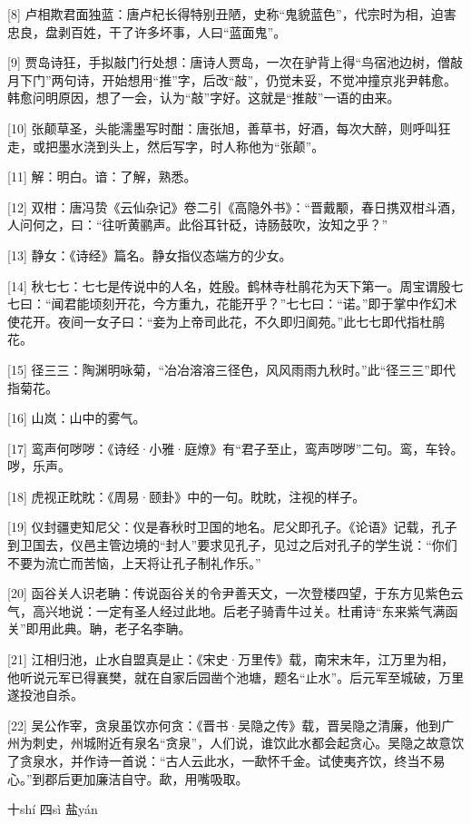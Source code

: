 \documentclass[12pt,UTF8]{ctexbook}
\begin{document}
[8] 卢相欺君面独蓝：唐卢杞长得特别丑陋，史称“鬼貌蓝色”，代宗时为相，迫害忠良，盘剥百姓，干了许多坏事，人曰“蓝面鬼”。

[9] 贾岛诗狂，手拟敲门行处想：唐诗人贾岛，一次在驴背上得“鸟宿池边树，僧敲月下门”两句诗，开始想用“推”字，后改“敲”，仍觉未妥，不觉冲撞京兆尹韩愈。韩愈问明原因，想了一会，认为“敲”字好。这就是“推敲”一语的由来。

[10] 张颠草圣，头能濡墨写时酣：唐张旭，善草书，好酒，每次大醉，则呼叫狂走，或把墨水浇到头上，然后写字，时人称他为“张颠”。

[11] 解：明白。谙：了解，熟悉。

[12] 双柑：唐冯贽《云仙杂记》卷二引《高隐外书》：“晋戴颙，春日携双柑斗酒，人问何之，曰：“往听黄鹂声。此俗耳针砭，诗肠鼓吹，汝知之乎？”

[13] 静女：《诗经》篇名。静女指仪态端方的少女。

[14] 秋七七：七七是传说中的人名，姓殷。鹤林寺杜鹃花为天下第一。周宝谓殷七七曰：“闻君能顷刻开花，今方重九，花能开乎？”七七曰：“诺。”即于掌中作幻术使花开。夜间一女子曰：“妾为上帝司此花，不久即归阆苑。”此七七即代指杜鹃花。

[15] 径三三：陶渊明咏菊，“冶冶溶溶三径色，风风雨雨九秋时。”此“径三三”即代指菊花。

[16] 山岚：山中的雾气。

[17] 鸾声何哕哕：《诗经·小雅·庭燎》有“君子至止，鸾声哕哕”二句。鸾，车铃。哕，乐声。

[18] 虎视正眈眈：《周易·颐卦》中的一句。眈眈，注视的样子。

[19] 仪封疆吏知尼父：仪是春秋时卫国的地名。尼父即孔子。《论语》记载，孔子到卫国去，仪邑主管边境的“封人”要求见孔子，见过之后对孔子的学生说：“你们不要为流亡而苦恼，上天将让孔子制礼作乐。”

[20] 函谷关人识老聃：传说函谷关的令尹善天文，一次登楼四望，于东方见紫色云气，高兴地说：一定有圣人经过此地。后老子骑青牛过关。杜甫诗“东来紫气满函关”即用此典。聃，老子名李聃。

[21] 江相归池，止水自盟真是止：《宋史·万里传》载，南宋末年，江万里为相，他听说元军已得襄樊，就在自家后园凿个池塘，题名“止水”。后元军至城破，万里遂投池自杀。

[22] 吴公作宰，贪泉虽饮亦何贪：《晋书·吴隐之传》载，晋吴隐之清廉，他到广州为刺史，州城附近有泉名“贪泉”，人们说，谁饮此水都会起贪心。吴隐之故意饮了贪泉水，并作诗一首说：“古人云此水，一歃怀千金。试使夷齐饮，终当不易心。”到郡后更加廉洁自守。歃，用嘴吸取。





十shí 四sì 盐yán
\end{document}
